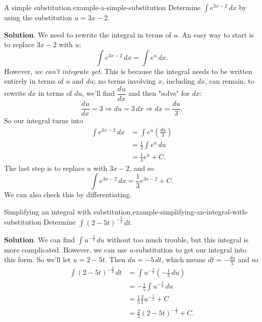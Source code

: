 \documentclass[10pt,]{book}
\numberwithin{equation}{section}
\newcommand{\dv}[3][]{\dfrac{d^{#1} #2}{d #3^{#1}}}
\begin{document}
%
\begin{example}{A simple substitution.}{example-a-simple-substitution}%
\hypertarget{p-481}{}%
Determine \(\int e^{3x - 2}\,dx\) by using the substitution \(u = 3x - 2\).%
\par\smallskip%
\noindent\textbf{Solution}.\hypertarget{solution-105}{}\quad%
\hypertarget{p-482}{}%
We need to rewrite the integral in terms of \(u\). An easy way to start is to replace \(3x-2\) with \(u\):%
\begin{equation*}
\int e^{3x-2}\,dx = \int e^{u}\,dx.
\end{equation*}
However, \emph{we can't integrate yet}. This is because the integral needs to be written entirely in terms of \(u\) and \(du\); no terms involving \(x\), including \(dx\), can remain. to rewrite \(dx\) in terms of \(du\), we'll find \(\dv{u}{x}\) and then "solve" for \(dx\):%
\begin{equation*}
\dv{u}{x} = 3 \Rightarrow du = 3\,dx \Rightarrow dx = \frac{du}{3}.
\end{equation*}
So our integral turns into%
\begin{align*}
\int e^{3x-2}\,dx & = \int e^{u}\left(\frac{du}{3}\right) \\
& = \frac{1}{3}\int e^{u}\,du \\
& = \frac{1}{3}e^{u} + C. 
\end{align*}
The last step is to replace \(u\) with \(3x-2\), and so%
\begin{equation*}
\int e^{3x-2}\,dx = \frac{1}{3}e^{3x-2} + C.
\end{equation*}
We can also check this by differentiating.%
\end{example}
\begin{example}{Simplifying an integral with substitution.}{example-simplifying-an-integral-with-substitution}%
\hypertarget{p-483}{}%
Determine \(\int(2 - 5t)^{-\frac{3}{2}}\,dt\).%
\par\smallskip%
\noindent\textbf{Solution}.\hypertarget{solution-106}{}\quad%
\hypertarget{p-484}{}%
We can find \(\int u^{-\frac{3}{2}}\,du\) without too much trouble, but this integral is more complicated. However, we can use \(u\)-substitution to get our integral into this form. So we'll let \(u = 2 - 5t\). Then \(du = -5\,dt\), which means \(dt = -\frac{du}{5}\) and so%
\begin{align*}
\int(2-5t)^{-\frac{3}{2}}\,dt & = \int u^{-\frac{3}{2}}\left(-\frac{1}{5}\,du\right) \\
& = -\frac{1}{5}\int u^{-\frac{3}{2}}\,du \\
& = \frac{1}{5}\frac{2}{1}u^{-\frac{1}{2}} + C \\
& = \frac{2}{5}(2 - 5t)^{-\frac{1}{2}} + C. 
\end{align*}
%
\end{example}
\end{document}
